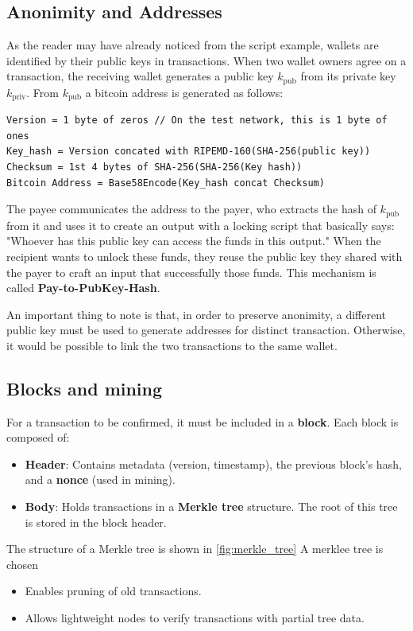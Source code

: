 \subsection{Anonimity and Addresses}
As the reader may have already noticed from the script example, wallets are identified by their public keys
in transactions.
When two wallet owners agree on a transaction, the receiving wallet generates a public key \(k_{\text{pub}}\)
from its private key \(k_{\text{priv}}\).
From \(k_{\text{pub}}\) a bitcoin address is generated as follows:

\begin{verbatim}
Version = 1 byte of zeros // On the test network, this is 1 byte of ones
Key_hash = Version concated with RIPEMD-160(SHA-256(public key))
Checksum = 1st 4 bytes of SHA-256(SHA-256(Key hash))
Bitcoin Address = Base58Encode(Key_hash concat Checksum)
\end{verbatim}

The payee communicates the address to the payer, who extracts the hash of \(k_{\text{pub}}\) from it and uses
it to create an output with a locking script that basically says:
"Whoever has this public key can access the funds in this output."
When the recipient wants to unlock these funds, they reuse the public key they shared with the payer to craft
an input that successfully those funds.
This mechanism is called \textbf{Pay-to-PubKey-Hash}.

An important thing to note is that, in order to preserve anonimity, a different public key must be used to
generate addresses for distinct transaction.
Otherwise, it would be possible to link the two transactions to the same wallet.

\subsection{Blocks and mining}
For a transaction to be confirmed, it must be included in a \textbf{block}.
Each block is composed of:
\begin{itemize}
  \item \textbf{Header}: Contains metadata (version, timestamp), the previous block's hash, and a
    \textbf{nonce} (used in mining).
  \item \textbf{Body}: Holds transactions in a \textbf{Merkle tree} structure. The root of this tree is
    stored in the block header.
\end{itemize}

The structure of a Merkle tree is shown in \ref{fig:merkle_tree} A merklee tree is chosen
\begin{itemize}
  \item Enables pruning of old transactions.
  \item Allows lightweight nodes to verify transactions with partial tree data.
\end{itemize}

